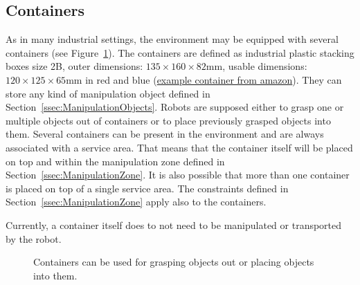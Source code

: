 \subsection{Containers}
As in many industrial settings, the \RCAW environment may be equipped with several containers (see Figure~\ref{fig:containers}). The containers are defined as industrial plastic stacking boxes size 2B, outer dimensions: $135 \times 160 \times 82  \si{\milli\meter}$, usable dimensions: $120 \times 125 \times 65  \si{\milli\meter}$  in red and blue (\href{https://www.amazon.de/gp/product/B0062TUUOE/ref=ppx_yo_dt_b_asin_title_o01_s00?ie=UTF8&psc=1}{example container from amazon}). 
They can store any kind of manipulation object defined in Section~\ref{ssec:ManipulationObjects}. Robots are supposed either to grasp one or multiple objects out of containers or to place previously grasped objects into them. Several containers can be present in the environment and are always associated with a service area. That means that the container itself will be placed on top and within the manipulation zone defined in Section~\ref{ssec:ManipulationZone}.
It is also possible that more than one container is placed on top of a single service area.
The constraints defined in Section~\ref{ssec:ManipulationZone} apply also to the containers.

Currently, a container itself does to not need to be manipulated or transported by the robot.

\begin{figure} [h!]
	\begin{center}
		 \hspace{1cm}
	\end{center}
	\caption{Containers can be used for grasping objects out or placing objects into them.}
	\label{fig:containers}
\end{figure}


